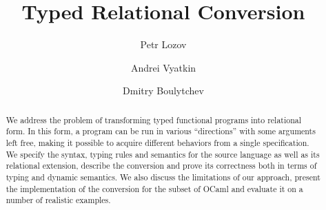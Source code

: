 \documentclass{llncs}
\begin{document}
\sloppy
\mainmatter

\title{Typed Relational Conversion}

\author{
  Petr Lozov \and Andrei Vyatkin \and Dmitry Boulytchev
}


\maketitle

\begin{abstract}
We address the problem of transforming typed functional programs into relational form. 
In this form, a program can be run in various ``directions'' with some arguments left free, 
making it possible to acquire different behaviors from a single specification. We specify the 
syntax, typing rules and semantics for the source language as well as its relational extension, 
describe the conversion and prove its correctness both in terms of typing and dynamic semantics. 
We also discuss the limitations of our approach, present the implementation of the conversion for 
the subset of OCaml and evaluate it on a number of realistic examples.
\end{abstract}







\end{document}
